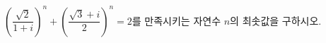 $\left(\dfrac{\sqrt{2}}{1+i}\right)^n+\left(\dfrac{\sqrt{3}+i}{2}\right)^n=2$를 만족시키는 자연수 $n$의 최솟값을 구하시오. 
